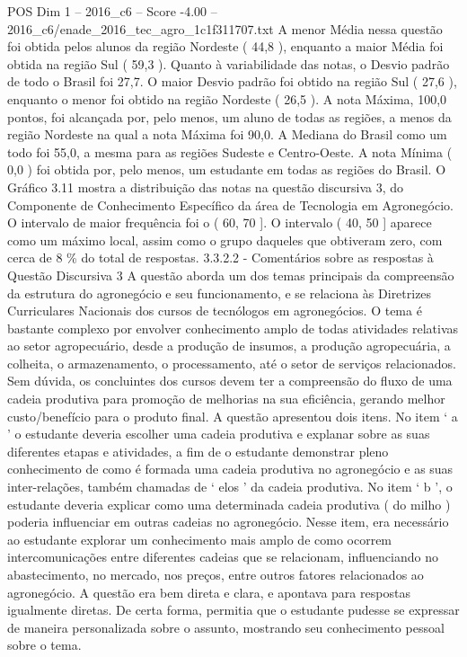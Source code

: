 \begin{textsample}{POS Dim 1 – 2016\_c6 – Score -4.00 – 2016\_c6/enade\_2016\_tec\_agro\_1c1f311707.txt}
A menor Média nessa questão foi obtida pelos alunos da região Nordeste ( 44,8 ), enquanto a maior Média foi obtida na região Sul ( 59,3 ).
Quanto à variabilidade das notas, o Desvio padrão de todo o Brasil foi 27,7.
O maior Desvio padrão foi obtido na região Sul ( 27,6 ), enquanto o menor foi obtido na região Nordeste ( 26,5 ).
A nota Máxima, 100,0 pontos, foi alcançada por, pelo menos, um aluno de todas as regiões, a menos da região Nordeste na qual a nota Máxima foi 90,0.
A Mediana do Brasil como um todo foi 55,0, a mesma para as regiões Sudeste e Centro-Oeste.
A nota Mínima ( 0,0 ) foi obtida por, pelo menos, um estudante em todas as regiões do Brasil.
O Gráfico 3.11 mostra a distribuição das notas na questão discursiva 3, do Componente de Conhecimento Específico da área de Tecnologia em Agronegócio.
O intervalo de maior frequência foi o ( 60, 70 ].
O intervalo ( 40, 50 ] aparece como um máximo local, assim como o grupo daqueles que obtiveram zero, com cerca de 8 \% do total de respostas. 3.3.2.2 - Comentários sobre as respostas à Questão Discursiva 3 A questão aborda um dos temas principais da compreensão da estrutura do agronegócio e seu funcionamento, e se relaciona às Diretrizes Curriculares Nacionais dos cursos de tecnólogos em agronegócios.
O tema é bastante complexo por envolver conhecimento amplo de todas atividades relativas ao setor agropecuário, desde a produção de insumos, a produção agropecuária, a colheita, o armazenamento, o processamento, até o setor de serviços relacionados.
Sem dúvida, os concluintes dos cursos devem ter a compreensão do fluxo de uma cadeia produtiva para promoção de melhorias na sua eficiência, gerando melhor custo/benefício para o produto final.
A questão apresentou dois itens.
No item ‘ a ’ o estudante deveria escolher uma cadeia produtiva e explanar sobre as suas diferentes etapas e atividades, a fim de o estudante demonstrar pleno conhecimento de como é formada uma cadeia produtiva no agronegócio e as suas inter-relações, também chamadas de ‘ elos ’ da cadeia produtiva.
No item ‘ b ’, o estudante deveria explicar como uma determinada cadeia produtiva ( do milho ) poderia influenciar em outras cadeias no agronegócio.
Nesse item, era necessário ao estudante explorar um conhecimento mais amplo de como ocorrem intercomunicações entre diferentes cadeias que se relacionam, influenciando no abastecimento, no mercado, nos preços, entre outros fatores relacionados ao agronegócio.
A questão era bem direta e clara, e apontava para respostas igualmente diretas.
De certa forma, permitia que o estudante pudesse se expressar de maneira personalizada sobre o assunto, mostrando seu conhecimento pessoal sobre o tema.

\end{textsample}
